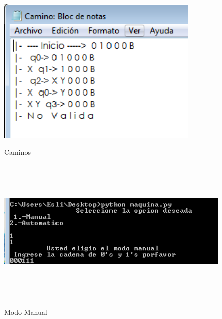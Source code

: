 \documentclass[12pt]{article}
\begin{document}
\begin{figure}[H]
\includegraphics[width=\textwidth, height=7cm]{auto_maquina_camino}
\label{fig:manual_afn}
\caption{Caminos}
\end{figure}

\begin{figure}[H]
\includegraphics[width=\textwidth, height=7cm]{manual_maquina}
\label{fig:manual_afn}
\caption{Modo Manual}
\end{figure}
\end{document}
